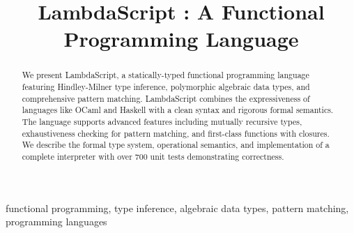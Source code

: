 \documentclass[conference]{IEEEtran}
\begin{document}
\title{LambdaScript : A Functional Programming Language}

\author{
}

\maketitle

\begin{abstract}
We present LambdaScript, a statically-typed functional programming language featuring Hindley-Milner type inference, polymorphic algebraic data types, and comprehensive pattern matching. LambdaScript combines the expressiveness of languages like OCaml and Haskell with a clean syntax and rigorous formal semantics. The language supports advanced features including mutually recursive types, exhaustiveness checking for pattern matching, and first-class functions with closures. We describe the formal type system, operational semantics, and implementation of a complete interpreter with over 700 unit tests demonstrating correctness.
\end{abstract}

\begin{IEEEkeywords}
functional programming, type inference, algebraic data types, pattern matching, programming languages
\end{IEEEkeywords}
\end{document}
